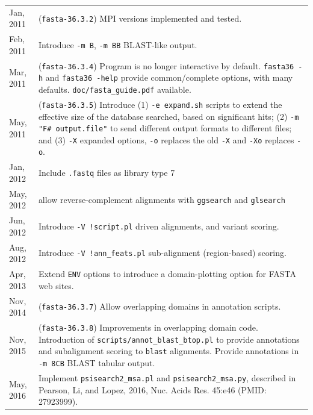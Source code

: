 \begin{longtable}{p{0.75 in}p{5.25 in}}
Jan, 2011 & (\texttt{fasta-36.3.2}) MPI versions implemented and tested.\\[1ex]

Feb, 2011 & Introduce \texttt{-m B}, \texttt{-m BB} BLAST-like output.\\[1.0ex]

Mar, 2011 & (\texttt{fasta-36.3.4}) Program is no longer interactive by
default. \texttt{fasta36 -h} and \texttt{fasta36 -help} provide
common/complete options, with many defaults. \texttt{doc/fasta\_guide.pdf} available.\\[1.0ex]

May, 2011 & (\texttt{fasta-36.3.5}) Introduce (1) \texttt{-e
  expand.sh} scripts to extend the effective size of the database
searched, based on significant hits; (2) \texttt{-m "F\# output.file"}
to send different output formats to different files; and (3)
\texttt{-X} expanded options, \texttt{-o} replaces the old \texttt{-X}
and \texttt{-Xo} replaces \texttt{-o}. \\[1.0ex]

Jan, 2012 & Include \texttt{.fastq} files as library type 7 \\[1.0ex]

May, 2012 & allow reverse-complement alignments with \texttt{ggsearch} and \texttt{glsearch} \\[1.0ex]

Jun, 2012 & Introduce \texttt{-V !script.pl} driven alignments, and variant scoring.\\[1.0ex]

Aug, 2012 & Introduce \texttt{-V !ann\_feats.pl} sub-alignment (region-based) scoring.\\[1.0ex]

Apr, 2013 & Extend \texttt{ENV} options to introduce a domain-plotting option for FASTA web sites.\\[1.0ex]

Nov, 2014 & (\texttt{fasta-36.3.7}) Allow overlapping domains in annotation scripts.\\[1.0ex]

Nov, 2015 & (\texttt{fasta-36.3.8}) Improvements in overlapping domain
code. Introduction of \texttt{scripts/annot\_blast\_btop.pl} to
provide annotations and subalignment scoring to \texttt{blast}
alignments.  Provide annotations in \texttt{-m 8CB} BLAST tabular
output. \\[1.0ex]
       
May, 2016 & Implement \texttt{psisearch2\_msa.pl} and \texttt{psisearch2\_msa.py}, 
described in Pearson, Li, and Lopez, 2016, Nuc. Acids Res. 45:e46 (PMID: 27923999).
\\[1.0ex]


\end{longtable}
